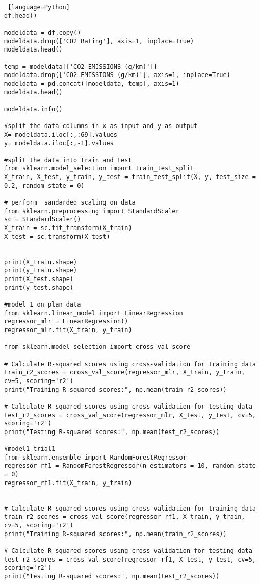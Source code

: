 \documentclass[12pt, a4paper,oneside]{book}
\numberwithin{equation}{section}
\begin{document}
\begin{lstlisting} [language=Python]
df.head()

modeldata = df.copy()
modeldata.drop(['CO2 Rating'], axis=1, inplace=True)
modeldata.head()

temp = modeldata[['CO2 EMISSIONS (g/km)']]
modeldata.drop(['CO2 EMISSIONS (g/km)'], axis=1, inplace=True)
modeldata = pd.concat([modeldata, temp], axis=1)
modeldata.head()

modeldata.info()

#split the data columns in x as input and y as output
X= modeldata.iloc[:,:69].values
y= modeldata.iloc[:,-1].values

#split the data into train and test 
from sklearn.model_selection import train_test_split
X_train, X_test, y_train, y_test = train_test_split(X, y, test_size = 0.2, random_state = 0)

# perform  sandarded scaling on data 
from sklearn.preprocessing import StandardScaler
sc = StandardScaler()
X_train = sc.fit_transform(X_train)
X_test = sc.transform(X_test)


print(X_train.shape)
print(y_train.shape)
print(X_test.shape)
print(y_test.shape)

#model 1 on plan data 
from sklearn.linear_model import LinearRegression
regressor_mlr = LinearRegression()
regressor_mlr.fit(X_train, y_train)

from sklearn.model_selection import cross_val_score

# Calculate R-squared scores using cross-validation for training data
train_r2_scores = cross_val_score(regressor_mlr, X_train, y_train, cv=5, scoring='r2')
print("Training R-squared scores:", np.mean(train_r2_scores))

# Calculate R-squared scores using cross-validation for testing data
test_r2_scores = cross_val_score(regressor_mlr, X_test, y_test, cv=5, scoring='r2')
print("Testing R-squared scores:", np.mean(test_r2_scores))

#model1 trial1
from sklearn.ensemble import RandomForestRegressor
regressor_rf1 = RandomForestRegressor(n_estimators = 10, random_state = 0)
regressor_rf1.fit(X_train, y_train)


# Calculate R-squared scores using cross-validation for training data
train_r2_scores = cross_val_score(regressor_rf1, X_train, y_train, cv=5, scoring='r2')
print("Training R-squared scores:", np.mean(train_r2_scores))

# Calculate R-squared scores using cross-validation for testing data
test_r2_scores = cross_val_score(regressor_rf1, X_test, y_test, cv=5, scoring='r2')
print("Testing R-squared scores:", np.mean(test_r2_scores))


\end{lstlisting}
\end{document}
